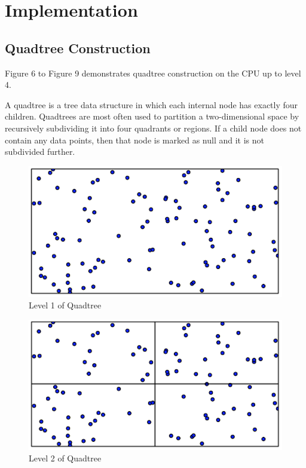 \documentclass{article}
\begin{document}
\clearpage
\section{Implementation}

\subsection{Quadtree Construction}

Figure 6 to Figure 9 demonstrates quadtree construction on the CPU up to level 4.

A quadtree is a tree data structure in which each internal node has exactly four children. Quadtrees are most often used to partition a two-dimensional space by recursively subdividing it into four quadrants or regions. If a child node does not contain any data points, then that node is marked as null and it is not subdivided further.

 \begin{figure}[ht]
   \centering
\includegraphics[scale=0.5]{Quadtree_construction1}
\caption{Level 1 of Quadtree}
 \end{figure}
 
  \begin{figure}[ht]
    \centering
\includegraphics[scale=0.5]{Quadtree_construction2}
\caption{Level 2 of Quadtree}
 \end{figure}
 
\end{document}
